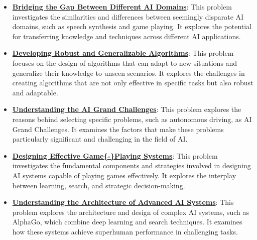 \documentclass{article}%
\begin{document}
\begin{itemize}[leftmargin=*]
\item \href{https://purdue.brightspace.com/d2l/common/assets/pdfjs-d2l-dist/1.0.14-legacy/web/viewer.html?file=\%2Fcontent\%2Fenforced\%2F1095467-wl.202510.CS.24300.001\%2F02L2-Intro.pdf\%3Fou\%3D1095467\&lang=en-us\&container=d2l-fileviewer-rendered-pdf\&fullscreen=d2l-fileviewer-rendered-pdf-dialog\&height=667#page=31}{\textbf{Bridging the Gap Between Different AI Domains}}: This problem investigates the similarities and differences between seemingly disparate AI domains, such as speech synthesis and game playing. It explores the potential for transferring knowledge and techniques across different AI applications.%
\item \href{https://purdue.brightspace.com/d2l/common/assets/pdfjs-d2l-dist/1.0.14-legacy/web/viewer.html?file=\%2Fcontent\%2Fenforced\%2F1095467-wl.202510.CS.24300.001\%2F02L2-Intro.pdf\%3Fou\%3D1095467\&lang=en-us\&container=d2l-fileviewer-rendered-pdf\&fullscreen=d2l-fileviewer-rendered-pdf-dialog\&height=667#page=36}{\textbf{Developing Robust and Generalizable Algorithms}}: This problem focuses on the design of algorithms that can adapt to new situations and generalize their knowledge to unseen scenarios. It explores the challenges in creating algorithms that are not only effective in specific tasks but also robust and adaptable.%
\item \href{https://purdue.brightspace.com/d2l/common/assets/pdfjs-d2l-dist/1.0.14-legacy/web/viewer.html?file=\%2Fcontent\%2Fenforced\%2F1095467-wl.202510.CS.24300.001\%2F02L2-Intro.pdf\%3Fou\%3D1095467\&lang=en-us\&container=d2l-fileviewer-rendered-pdf\&fullscreen=d2l-fileviewer-rendered-pdf-dialog\&height=667#page=43}{\textbf{Understanding the AI Grand Challenges}}: This problem explores the reasons behind selecting specific problems, such as autonomous driving, as AI Grand Challenges. It examines the factors that make these problems particularly significant and challenging in the field of AI.%
\item \href{https://purdue.brightspace.com/d2l/common/assets/pdfjs-d2l-dist/1.0.14-legacy/web/viewer.html?file=\%2Fcontent\%2Fenforced\%2F1095467-wl.202510.CS.24300.001\%2F02L2-Intro.pdf\%3Fou\%3D1095467\&lang=en-us\&container=d2l-fileviewer-rendered-pdf\&fullscreen=d2l-fileviewer-rendered-pdf-dialog\&height=667#page=47}{\textbf{Designing Effective Game\{{-}\}Playing Systems}}: This problem investigates the fundamental components and strategies involved in designing AI systems capable of playing games effectively. It explores the interplay between learning, search, and strategic decision{-}making.%
\item \href{https://purdue.brightspace.com/d2l/common/assets/pdfjs-d2l-dist/1.0.14-legacy/web/viewer.html?file=\%2Fcontent\%2Fenforced\%2F1095467-wl.202510.CS.24300.001\%2F02L2-Intro.pdf\%3Fou\%3D1095467\&lang=en-us\&container=d2l-fileviewer-rendered-pdf\&fullscreen=d2l-fileviewer-rendered-pdf-dialog\&height=667#page=50}{\textbf{Understanding the Architecture of Advanced AI Systems}}: This problem explores the architecture and design of complex AI systems, such as AlphaGo, which combine deep learning and search techniques. It examines how these systems achieve superhuman performance in challenging tasks.%
\end{itemize}%
\end{document}
